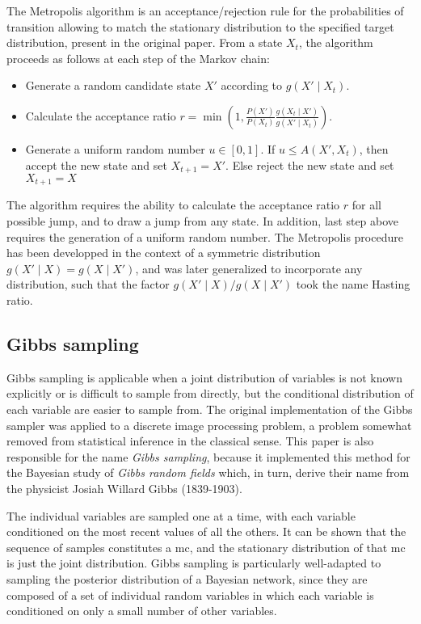 The Metropolis algorithm is an acceptance/rejection rule for the probabilities of transition allowing to match the stationary distribution to the specified target distribution, present in the original paper.
From a state $X_t$, the algorithm proceeds as follows at each step of the Markov chain:
\begin{itemize}
	\item Generate a random candidate state $X'$ according to $g(X'\mid X_t)$.
	\item Calculate the acceptance ratio $\displaystyle r=\min \left(1,{\frac {P(X')}{P(X_{t})}}{\frac {g(X_{t}\mid X')}{g(X'\mid X_{t})}}\right)$.
	\item Generate a uniform random number $u\in [0,1]$.
	If $u\leq A(X',X_{t})$, then accept the new state and set $X_{t+1}=X'$.
	Else reject the new state and set $X_{t+1}=X$
\end{itemize}

The algorithm requires the ability to calculate the acceptance ratio $r$ for all possible jump, and to draw a jump from any state. 
In addition, last step above requires the generation of a uniform random number.
The Metropolis procedure has been developped in the context of a symmetric distribution $g(X'\mid X) = g(X \mid X')$, and was later generalized to incorporate any distribution, such that the factor $g(X'\mid X) / g(X \mid X')$ took the name Hasting ratio.

\subsection{Gibbs sampling}

Gibbs sampling is applicable when a joint distribution of variables is not known explicitly or is difficult to sample from directly, but the conditional distribution of each variable are easier to sample from.
The original implementation of the Gibbs sampler was applied to a discrete image processing problem, a problem somewhat removed from statistical inference in the classical sense.
This paper is also responsible for the name {\it Gibbs sampling}, because it implemented this method for the Bayesian study of {\it Gibbs random fields} which, in turn, derive their name from the physicist Josiah Willard Gibbs (1839-1903).

The individual variables are sampled one at a time, with each variable conditioned on the most recent values of all the others.
It can be shown that the sequence of samples constitutes a \gls{mc}, and the stationary distribution of that \gls{mc} is just the joint distribution.
Gibbs sampling is particularly well-adapted to sampling the \gls{posterior} distribution of a Bayesian network, since they are composed of a set of individual random variables in which each variable is conditioned on only a small number of other variables.

